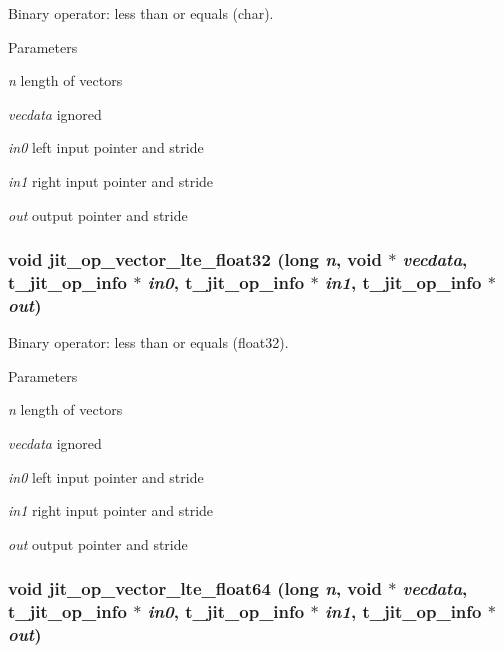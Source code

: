 Binary operator: less than or equals (char). 
\begin{DoxyParams}{Parameters}
\item[{\em n}]length of vectors \item[{\em vecdata}]ignored \item[{\em in0}]left input pointer and stride \item[{\em in1}]right input pointer and stride \item[{\em out}]output pointer and stride \end{DoxyParams}
\hypertarget{group__opvecmod_gad88b412468d3d4962b1bfcef9c1e6a18}{
\subsubsection[{jit\_\-op\_\-vector\_\-lte\_\-float32}]{\setlength{\rightskip}{0pt plus 5cm}void jit\_\-op\_\-vector\_\-lte\_\-float32 (long {\em n}, \/  void $\ast$ {\em vecdata}, \/  {\bf t\_\-jit\_\-op\_\-info} $\ast$ {\em in0}, \/  {\bf t\_\-jit\_\-op\_\-info} $\ast$ {\em in1}, \/  {\bf t\_\-jit\_\-op\_\-info} $\ast$ {\em out})}}
\label{group__opvecmod_gad88b412468d3d4962b1bfcef9c1e6a18}


Binary operator: less than or equals (float32). 
\begin{DoxyParams}{Parameters}
\item[{\em n}]length of vectors \item[{\em vecdata}]ignored \item[{\em in0}]left input pointer and stride \item[{\em in1}]right input pointer and stride \item[{\em out}]output pointer and stride \end{DoxyParams}
\hypertarget{group__opvecmod_ga7fd4a4b51016115efe6f35273b00983a}{
\subsubsection[{jit\_\-op\_\-vector\_\-lte\_\-float64}]{\setlength{\rightskip}{0pt plus 5cm}void jit\_\-op\_\-vector\_\-lte\_\-float64 (long {\em n}, \/  void $\ast$ {\em vecdata}, \/  {\bf t\_\-jit\_\-op\_\-info} $\ast$ {\em in0}, \/  {\bf t\_\-jit\_\-op\_\-info} $\ast$ {\em in1}, \/  {\bf t\_\-jit\_\-op\_\-info} $\ast$ {\em out})}}
\label{group__opvecmod_ga7fd4a4b51016115efe6f35273b00983a}



